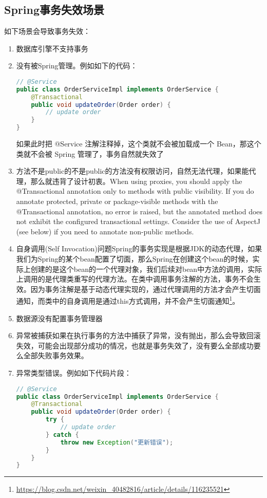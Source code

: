 \documentclass[../../../interview-questions.tex]{subfiles}
\begin{document}
\subsection{Spring事务失效场景}

如下场景会导致事务失效：

\begin{enumerate}
    \item {数据库引擎不支持事务}
    \item {没有被Spring管理。}例如如下的代码：
    
\begin{lstlisting}[language=Java]
// @Service
public class OrderServiceImpl implements OrderService {
    @Transactional
    public void updateOrder(Order order) {
        // update order
    }
}
\end{lstlisting}

    如果此时把 @Service 注解注释掉，这个类就不会被加载成一个 Bean，那这个类就不会被 Spring 管理了，事务自然就失效了

    \item {方法不是public的}不是public的方法没有权限访问，自然无法代理，如果能代理，那么就违背了设计初衷。When using proxies, you should apply the @Transactional annotation only to methods with public visibility. If you do annotate protected, private or package-visible methods with the @Transactional annotation, no error is raised, but the annotated method does not exhibit the configured transactional settings. Consider the use of AspectJ (see below) if you need to annotate non-public methods.
    \item {自身调用(Self Invocation)问题}Spring的事务实现是根据JDK的动态代理，如果我们为Spring的某个bean配置了切面，那么Spring在创建这个bean的时候，实际上创建的是这个bean的一个代理对象，我们后续对bean中方法的调用，实际上调用的是代理类重写的代理方法。在类中调用事务注解的方法，事务不会生效。因为事务注解是基于动态代理实现的，通过代理调用的方法才会产生切面通知，而类中的自身调用是通过this方式调用，并不会产生切面通知\footnote{\url{https://blog.csdn.net/weixin_40482816/article/details/116235521}}。
    \item {数据源没有配置事务管理器}
    \item {异常被捕获}如果在执行事务的方法中捕获了异常，没有抛出，那么会导致回滚失效，可能会出现部分成功的情况，也就是事务失效了，没有要么全部成功要么全部失败事务效果。
    \item {异常类型错误。}例如如下代码片段：
    
\begin{lstlisting}[language=Java]
// @Service
public class OrderServiceImpl implements OrderService {
    @Transactional
    public void updateOrder(Order order) {
        try {
            // update order
        } catch {
            throw new Exception("更新错误");
        }
    }  
}
\end{lstlisting}


\end{enumerate}
\end{document}
